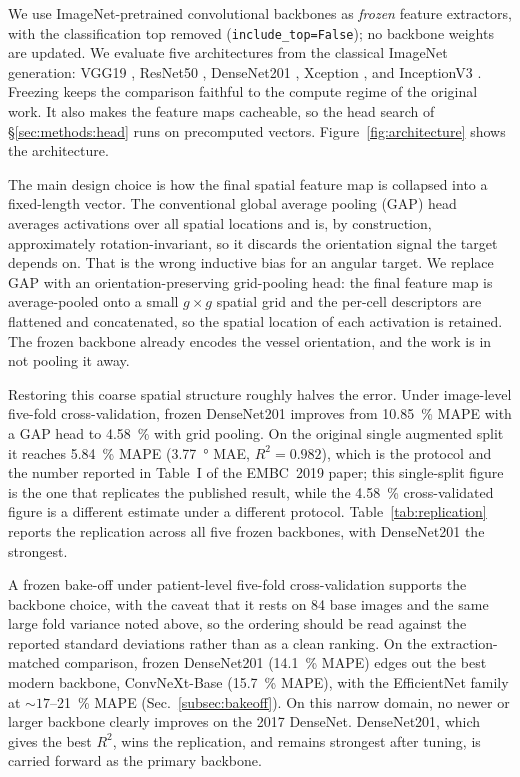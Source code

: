 We use ImageNet-pretrained \citep{Deng2009} convolutional backbones as \emph{frozen} feature extractors, with the classification top removed (\texttt{include\_top=False}); no backbone weights are updated. We evaluate five architectures from the classical ImageNet generation: VGG19 \citep{Simonyan2015}, ResNet50 \citep{He2016}, DenseNet201 \citep{Huang2017}, Xception \citep{Chollet2017}, and InceptionV3 \citep{Szegedy2016}. Freezing keeps the comparison faithful to the compute regime of the original work. It also makes the feature maps cacheable, so the head search of \S\ref{sec:methods:head} runs on precomputed vectors. Figure~\ref{fig:architecture} shows the architecture.



The main design choice is how the final spatial feature map is collapsed into a fixed-length vector. The conventional global average pooling (GAP) head averages activations over all spatial locations and is, by construction, approximately rotation-invariant, so it discards the orientation signal the target depends on. That is the wrong inductive bias for an angular target. We replace GAP with an orientation-preserving grid-pooling head: the final feature map is average-pooled onto a small $g\times g$ spatial grid and the per-cell descriptors are flattened and concatenated, so the spatial location of each activation is retained. The frozen backbone already encodes the vessel orientation, and the work is in not pooling it away.

Restoring this coarse spatial structure roughly halves the error. Under image-level five-fold cross-validation, frozen DenseNet201 improves from \SI{10.85}{\percent} MAPE with a GAP head to \SI{4.58}{\percent} with grid pooling. On the original single augmented split it reaches \SI{5.84}{\percent} MAPE (\SI{3.77}{\degree} MAE, $R^2=0.982$), which is the protocol and the number reported in Table~I of the EMBC~2019 paper; this single-split figure is the one that replicates the published result, while the \SI{4.58}{\percent} cross-validated figure is a different estimate under a different protocol. Table~\ref{tab:replication} reports the replication across all five frozen backbones, with DenseNet201 the strongest.

A frozen bake-off under patient-level five-fold cross-validation supports the backbone choice, with the caveat that it rests on \num{84} base images and the same large fold variance noted above, so the ordering should be read against the reported standard deviations rather than as a clean ranking. On the extraction-matched comparison, frozen DenseNet201 (\SI{14.1}{\percent} MAPE) edges out the best modern backbone, ConvNeXt-Base \citep{Liu2022} (\SI{15.7}{\percent} MAPE), with the EfficientNet \citep{Tan2019} family at $\sim\!17$--\SI{21}{\percent} MAPE (Sec.~\ref{subsec:bakeoff}). On this narrow domain, no newer or larger backbone clearly improves on the 2017 DenseNet. DenseNet201, which gives the best $R^2$, wins the replication, and remains strongest after tuning, is carried forward as the primary backbone.


